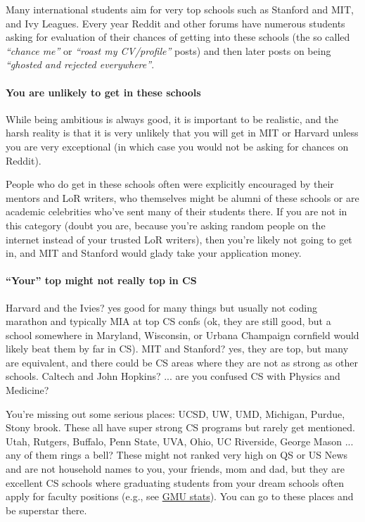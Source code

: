 \documentclass[oneside,11pt,dvipsnames]{book}
\begin{document}
Many international students aim for very top schools such as Stanford and MIT, and Ivy Leagues. Every year Reddit and other forums have numerous students asking for evaluation of their chances of getting into these schools (the so called \emph{``chance me''} or \emph{``roast my CV/profile''} posts) and then later posts on being \emph{``ghosted and rejected everywhere''}.

\paragraph{You are unlikely to get in these schools}  While being ambitious is always good, it is important to be realistic, and the harsh reality is that it is very unlikely that you will get in MIT or Harvard unless you are very exceptional (in which case you would not be asking for chances on Reddit). 

People who do get in these schools often were explicitly encouraged by their mentors and LoR writers, who themselves might be alumni of these schools or are academic celebrities who've sent many of their students there. If you are not in this category (doubt you are, because you're asking random people on the internet instead of your trusted LoR writers), then you're likely not going to get in, and MIT and Stanford would glady take your application money.

\paragraph{``Your'' top might not really top in CS} Harvard and the Ivies? yes good for many things but usually not coding marathon and typically MIA at top CS confs (ok, they are still good, but a school somewhere in Maryland, Wisconsin, or Urbana Champaign cornfield would likely beat them by far in CS). MIT and Stanford? yes, they are top, but many are equivalent, and there could be CS areas where they are not as strong as other schools.  Caltech and John Hopkins?  ... are you confused CS with Physics and Medicine?

You're missing out some serious places: UCSD, UW, UMD, Michigan, Purdue, Stony brook. These all have super strong CS programs but rarely get mentioned. Utah, Rutgers, Buffalo, Penn State, UVA, Ohio, UC Riverside, George Mason ... any of them rings a bell? These might not ranked very high on QS or US News and are not household names to you, your friends, mom and dad, but they are excellent CS schools where graduating students from your dream schools often apply for faculty positions (e.g., see \href{https://github.com/dynaroars/dynaroars.github.io/wiki/About-GMU}{GMU stats}). You can go to these places and be superstar there.
\end{document}
